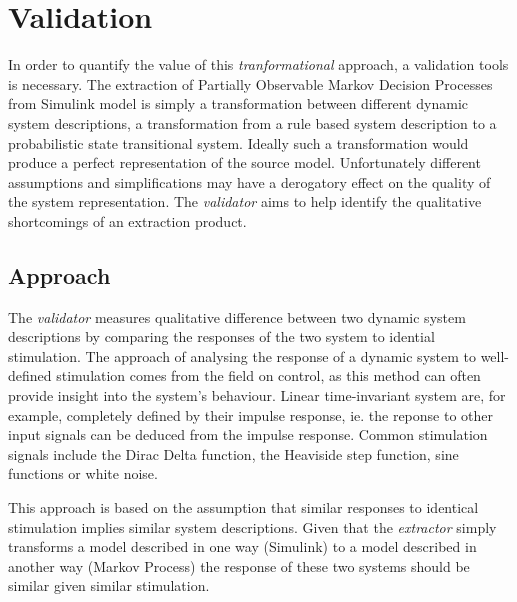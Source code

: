 \section{Validation}

In order to quantify the value of this \textit{tranformational} approach, a validation tools is necessary. The extraction of Partially Observable Markov Decision Processes from Simulink model is simply a transformation between different dynamic system descriptions, a transformation from a rule based system description to a probabilistic state transitional system. Ideally such a transformation would produce a perfect representation of the source model. Unfortunately different assumptions and simplifications may have a derogatory effect on the quality of the system representation. The \textit{validator} aims to help identify the qualitative shortcomings of an extraction product.



\subsection{Approach}

The \textit{validator} measures qualitative difference between two dynamic system descriptions by comparing the responses of the two system to idential stimulation. The approach of analysing the response of a dynamic system to well-defined stimulation comes from the field on control, as this method can often provide insight into the system's behaviour. Linear time-invariant system are, for example, completely defined by their impulse response, ie. the reponse to other input signals can be deduced from the impulse response. Common stimulation signals include the Dirac Delta function, the Heaviside step function, sine functions or white noise.

This approach is based on the assumption that similar responses to identical stimulation implies similar system descriptions. Given that the \textit{extractor} simply transforms a model described in one way (Simulink) to a model described in another way (Markov Process) the response of these two systems should be similar given similar stimulation.

